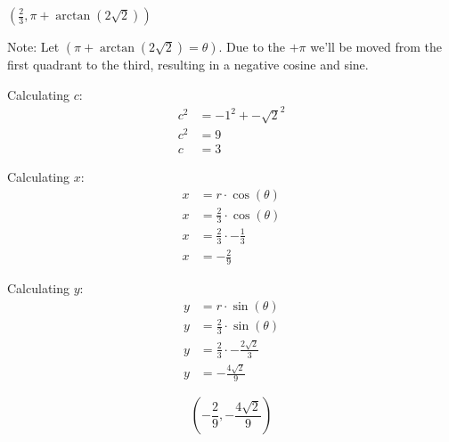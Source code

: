 \begin{problem}[34.]
    $\left( \frac{2}{3}, \pi + \arctan\left( 2\sqrt{2} \right) \right)$    
\end{problem}

\begin{solution}
    Note: Let $\left( \pi + \arctan\left( 2\sqrt{2} \right) = \theta \right)$. Due to the $+ \pi$ we'll be moved from the first quadrant to the third, resulting in a negative cosine and sine. \medskip
    
    \begin{center}
    \end{center}
    
    \medskip
    
    Calculating $c$:
    \begin{align}
        c^2 &= -1^2 + -\sqrt{2}^2 \\
        c^2 &= 9 \\
        c &= 3
    \end{align}
    
    Calculating $x$:
    \begin{align}
        x &= r \cdot \cos(\theta) \\
        x &= \frac{2}{3} \cdot \cos \left( \theta \right) \\
        x &= \frac{2}{3} \cdot -\frac{1}{3} \\
        x &= -\frac{2}{9}
    \end{align}
    
    Calculating $y$:
    \begin{align}
        y &= r \cdot \sin(\theta) \\
        y &= \frac{2}{3} \cdot \sin \left( \theta \right) \\
        y &= \frac{2}{3} \cdot -\frac{2\sqrt{2}}{3} \\
        y &= -\frac{4\sqrt{2}}{9}
    \end{align}
    
    \[\boxed{ \left( -\frac{2}{9}, -\frac{4\sqrt{2}}{9} \right) }\]
\end{solution}